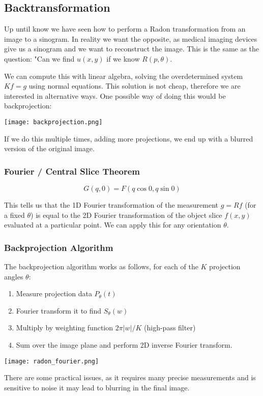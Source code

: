 \subsection{Backtransformation}

Up until know we have seen how to perform a Radon transformation from an image to a sinogram. In reality we want the opposite, as medical imaging devices give us a sinogram and we want to reconstruct the image. This is the same as the question: "Can we find $u(x,y)$ if we know $R(p, \theta)$. \medskip

We can compute this with linear algebra, solving the overdetermined system $K f = g$ using normal equations. This solution is not cheap, therefore we are interested in alternative ways. One possible way of doing this would be backprojection:
\begin{center}
	\texttt{[image: backprojection.png]}
\end{center}

If we do this multiple times, adding more projections, we end up with a blurred version of the original image.

\subsubsection{Fourier / Central Slice Theorem}
$$G(q, 0) = F(q \cos 0, q \sin 0)$$

This tells us that the 1D Fourier transformation of the measurement $g = Rf$ (for a fixed $\theta$) is equal to the 2D Fourier transformation of the object slice $f(x,y)$ evaluated at a particular point. We can apply this for any orientation $\theta$.

\subsubsection{Backprojection Algorithm}
The backprojection algorithm works as follows, for each of the $K$ projection angles $\theta$:
\begin{enumerate}
	\item Measure projection data $P_\theta(t)$
	\item Fourier transform it to find $S_\theta(w)$
	\item Multiply by weighting function $2 \pi |w| / K$ (high-pass filter)
	\item Sum over the image plane and perform 2D inverse Fourier transform.
\end{enumerate}

\begin{center}
	\texttt{[image: radon\_fourier.png]}
\end{center}

There are some practical issues, as it requires many precise measurements and is sensitive to noise it may lead to blurring in the final image.